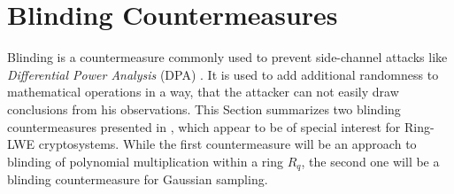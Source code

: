 %
%

\chapter{Blinding Countermeasures}
Blinding is a countermeasure commonly used to prevent side-channel attacks like \textit{Differential Power Analysis} (DPA) \cite{DBLP:conf/crypto/KocherJJ99}. It is used to add additional randomness to mathematical operations in a way, that the attacker can not easily draw conclusions from his observations. This Section summarizes two blinding countermeasures presented in \cite{cryptoeprint:2016:276}, which appear to be of special interest for Ring-LWE cryptosystems. While the first countermeasure will be an approach to blinding of polynomial multiplication within a ring \(R_q\), the second one will be a blinding countermeasure for Gaussian sampling.


